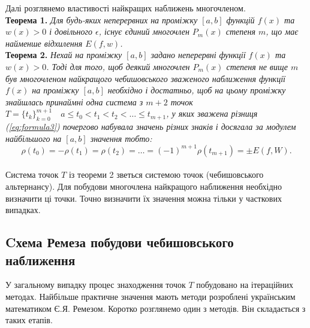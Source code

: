 \documentclass[ukrainian,14pt]{extarticle}
\def\ab{[a,b]}
\begin{document}
Далі розглянемо властивості найкращих наближень многочленом.\\

\noindent
\textbf{Теорема 1.}\textit{
Для будь-яких неперервних на проміжку $[a,b]$ функцій $f(x)$ та $w(x) > 0$ і довільного $\epsilon$, існує єдиний многочлен $P_m(x)$ степеня $m$, що має найменше відхилення $E(f,w)$.}\\

\noindent
\textbf{Теорема 2.}\textit{
Нехай на проміжку $[a,b]$ задано неперервні функції $f(x)$ та $w(x) > 0$.
Тоді для того, щоб деякий многочлен $P_m(x)$ степеня не вище $m$ був многочленом найкращого чебишовського зваженого наближення функції $f(x)$ на проміжку $\ab$ необхідно і достатньо, щоб на цьому проміжку знайшлась принаймні одна система з $m+2$ точок \\ $T=\{t_k\}_{k=0}^{m+1} \quad a \leq t_0 < t_1 < t_2 < \ldots \leq t_{m+1}$, у яких зважена різниця (\ref{eq:formula3}) почергово набувала значень різних знаків і досягала за модулем найбільшого на $\ab$ значення тобто:
}
\begin{equation}\label{eq:formula5}
\rho(t_0) = -\rho(t_1) = \rho(t_2) = \ldots = (-1)^{m+1}\rho(t_{m+1}) = \pm E(f,W).
\end{equation}\\


Система точок $T$ із теореми 2 зветься системою точок (чебишовського альтернансу). Для побудови многочлена найкращого наближення  необхідно визначити ці точки. Точно визначити їх значення можна тільки у часткових випадках. 

\subsection{Cхема Ремеза побудови чебишовського наближення}

У загальному випадку процес знаходження точок $T$ побудовано на ітераційних методах. Найбільше практичне значення мають методи розроблені українським математиком Є.Я. Ремезом. Коротко розглянемо один з методів. Він складається з таких етапів.
\end{document}
